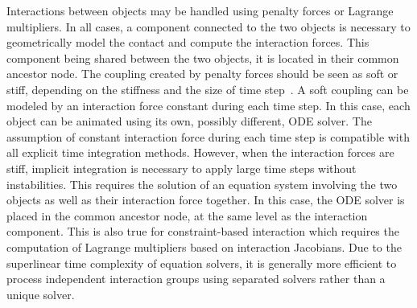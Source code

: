 Interactions between objects may be handled using penalty forces or Lagrange multipliers. 
In all cases, a component connected to the two objects is necessary to geometrically model the contact and compute the interaction forces.
This component being shared between the two objects, it is located in their common ancestor node.
The coupling created by penalty forces should be seen as soft or stiff, depending on the stiffness and the size of time step~\cite{baraff98large}.
A soft coupling can be modeled by an interaction force constant during each time step.
In this case, each object can be animated using its own, possibly different, ODE solver.
The assumption of constant interaction force during each time step is compatible with all explicit time integration methods.
However, when the interaction forces are stiff, implicit integration is necessary to apply large time steps without instabilities.
This requires the solution of an equation system involving the two objects as well as their interaction force together.
In this case, the ODE solver is placed in the common ancestor node, at the same level as the interaction component.
This is also true for constraint-based interaction which requires the computation of Lagrange multipliers based on interaction Jacobians. 
Due to the superlinear time complexity of equation solvers, it is generally more efficient to process independent interaction groups using separated solvers rather than a unique solver.

% 


